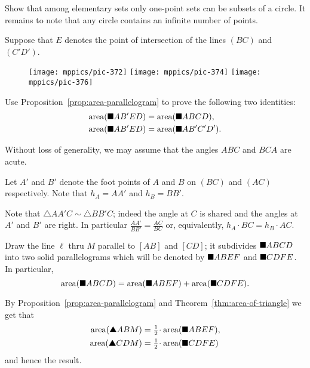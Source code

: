 Show that among elementary sets
only one-point sets can be subsets of a circle.
It remains to note that any circle contains an infinite number of points.



Suppose that $E$ denotes the point of intersection of the lines $(BC)$ and~$(C'D')$.

\begin{wrapfigure}{r}{28mm}
\vskip-0mm
\centering
\texttt{[image: mppics/pic-372]}
\vskip4mm
\texttt{[image: mppics/pic-374]}
\vskip4mm
\texttt{[image: mppics/pic-376]}
\vskip-6mm
\end{wrapfigure}

Use Proposition~\ref{prop:area-parallelogram} to prove the following two identities:
\begin{align*}
\mathop{\rm area}\nolimits(\blacksquare AB'ED)
&=\mathop{\rm area}\nolimits(\blacksquare ABCD),
\\
\mathop{\rm area}\nolimits(\blacksquare AB'ED)
&=\mathop{\rm area}\nolimits(\blacksquare AB'C'D').
\end{align*}

Without loss of generality, we may assume that the angles $ABC$ and $BCA$ are acute.

Let $A'$ and $B'$ denote the foot points of $A$ and $B$ on $(BC)$ and $(AC)$ respectively.
Note that $h_A=AA'$ and $h_B=BB'$.

Note that $\triangle AA'C\sim \triangle BB'C$;
indeed the angle at $C$ is shared and the angles at $A'$ and $B'$ are right.
In particular
$\frac{AA'}{BB'}=\frac{AC}{BC}$
or, equivalently, $h_A\cdot BC=h_B\cdot AC$.


Draw the line $\ell$ 
thru $M$ parallel to $[AB]$ and $[CD]$;
it subdivides $\blacksquare ABCD$ into two solid parallelograms
which will be denoted by
$\blacksquare ABEF$ and
$\blacksquare CDFE$.
In particular,
\[\mathop{\rm area}\nolimits(\blacksquare ABCD)
=
\mathop{\rm area}\nolimits(\blacksquare ABEF)+\mathop{\rm area}\nolimits(\blacksquare CDFE).\]

By Proposition~\ref{prop:area-parallelogram} and Theorem~\ref{thm:area-of-triangle} we get that 
\begin{align*}
\area(\solidtriangle ABM)&=\tfrac12\cdot\area(\solidsquare ABEF),
\\
\area(\solidtriangle CDM)&=\tfrac12\cdot\area(\solidsquare CDFE)
\end{align*}
and hence the result.


